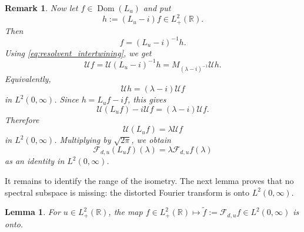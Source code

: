 \documentclass[10pt]{article}
\newtheorem{lemma}[theorem]{Lemma}
\newtheorem{remark}[theorem]{Remark}
\numberwithin{equation}{section}
\numberwithin{theorem}{section}
\begin{document}
\begin{remark}
Now let \(f\in\operatorname{Dom}(L_u)\) and put
\[
h:=(L_u-i)f\in L^2_+(\mathbb R).
\]
Then
\[
f=(L_u-i)^{-1}h.
\]
Using \eqref{eq:resolvent_intertwining}, we get
\[
\mathcal Uf
=
\mathcal U(L_u-i)^{-1}h
=
M_{(\lambda-i)^{-1}}\mathcal Uh.
\]
Equivalently,
\[
\mathcal Uh=(\lambda-i)\mathcal Uf
\]
in \(L^2(0,\infty)\). Since \(h=L_uf-if\), this gives
\[
\mathcal U(L_uf)-i\mathcal Uf
=
(\lambda-i)\mathcal Uf.
\]
Therefore
\[
\mathcal U(L_uf)=\lambda\mathcal Uf
\]
in \(L^2(0,\infty)\). Multiplying by \(\sqrt{2\pi}\), we obtain
\[
\mathcal F_{d,u}(L_u f)(\lambda)
=
\lambda \mathcal F_{d,u}f(\lambda)
\]
as an identity in \(L^2(0,\infty)\).
\end{remark}
\noindent \noindent
It remains to identify the range of the isometry. The next lemma proves that no spectral
subspace is missing: the distorted Fourier transform is onto \(L^2(0,\infty)\).
\begin{lemma}
\label{lemma 2.15}
For $u \in L_{+}^{2}(\mathbb R)$, the map $f \in L_{+}^2(\mathbb{R}) \mapsto \widetilde{f}:=\mathcal F_{d,u} f \in L^2(0, \infty)$ is onto.
\end{lemma}
\end{document}
